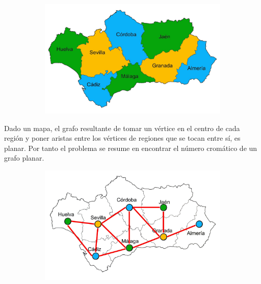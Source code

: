 \documentclass[a4paper,1pt]{report}
\begin{document}
\begin{figure}[H]
    \centering
    \begin{subfigure}[b]{0.55\textwidth}
        \centering
        \includegraphics[width=\textwidth]{figures6/Andalucia_Coloreada.jpg}
    \end{subfigure} 
\end{figure} 

Dado un mapa, el grafo resultante de tomar un vértice en el centro de cada región y poner aristas
entre los vértices de regiones que se tocan entre sí, es planar. Por tanto el problema se resume en encontrar el n\'umero crom\'atico de un grafo planar.

\begin{figure}[H]
    \centering
    \begin{subfigure}[b]{0.55\textwidth}
        \centering
        \includegraphics[width=\textwidth]{figures6/Grafo_Andalucia_Color.jpg}
    \end{subfigure} 
\end{figure} 
\end{document}
